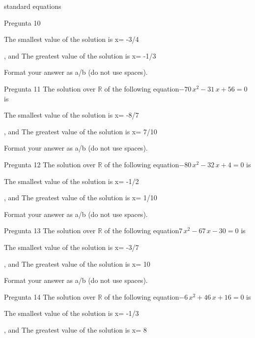 \begin{quiz}{standard equations }
\begin{cloze}{Pregunta 10 }
\begin{shortanswer}The smallest value of the solution is x=  -3/4 \end{shortanswer}
\begin{shortanswer}, and  The greatest value of the solution is x=  -1/3 \end{shortanswer}
Format your answer as a/b (do not use spaces).\end{cloze}\begin{cloze}{Pregunta 11 } The solution over $\mathbb{R}$ of the following equation$ -70\,x^2-31\,x+56=0  $ is 
\begin{shortanswer}The smallest value of the solution is x=  -8/7 \end{shortanswer}
\begin{shortanswer}, and  The greatest value of the solution is x=  7/10 \end{shortanswer}
Format your answer as a/b (do not use spaces).\end{cloze}\begin{cloze}{Pregunta 12 } The solution over $\mathbb{R}$ of the following equation$ -80\,x^2-32\,x+4=0  $ is 
\begin{shortanswer}The smallest value of the solution is x=  -1/2 \end{shortanswer}
\begin{shortanswer}, and  The greatest value of the solution is x=  1/10 \end{shortanswer}
Format your answer as a/b (do not use spaces).\end{cloze}\begin{cloze}{Pregunta 13 } The solution over $\mathbb{R}$ of the following equation$ 7\,x^2-67\,x-30=0  $ is 
\begin{shortanswer}The smallest value of the solution is x=  -3/7 \end{shortanswer}
\begin{shortanswer}, and  The greatest value of the solution is x=  10 \end{shortanswer}
Format your answer as a/b (do not use spaces).\end{cloze}\begin{cloze}{Pregunta 14 } The solution over $\mathbb{R}$ of the following equation$ -6\,x^2+46\,x+16=0  $ is 
\begin{shortanswer}The smallest value of the solution is x=  -1/3 \end{shortanswer}
\begin{shortanswer}, and  The greatest value of the solution is x=  8 \end{shortanswer}

\end{cloze}
\end{quiz}
